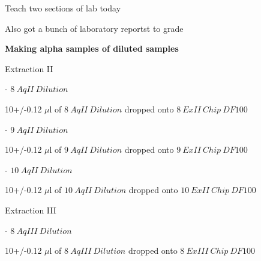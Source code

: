 \documentclass[idxtotoc,hyperref,openany,oneside]{labbook} %
\newcommand{\cmark}{\ding{51}}%
\newcommand{\done}{\rlap{$\square$}{\raisebox{2pt}{\large\hspace{1pt}\cmark}}%
  \hspace{-2.5pt}}
\begin{document}
\begin{todolist}
\item[\done]{Teach two sections of lab today}
\item[\done]{Also got a bunch of laboratory reportst to grade}
\end{todolist}


\textbf{Making alpha samples of diluted samples}
\begin{todolist}
\item[\done]{Extraction II}

  \begin{todolist}
  \item[\done]{- $\boxed{8\ AqII\ Dilution}$}
  \end{todolist}
  \vspace{0.3cm}
  \begin{center}
    10+/-0.12 $\mu$l of $\boxed{8\ AqII\ Dilution}$ dropped onto
    $\boxed{8\ ExII\ Chip\ DF100}$
  \end{center}
  
  \begin{todolist}
  \item[\done]{- $\boxed{9\ AqII\ Dilution}$}
  \end{todolist}
  \vspace{0.3cm}
  \begin{center}
    10+/-0.12 $\mu$l of $\boxed{9\ AqII\ Dilution}$ dropped onto
    $\boxed{9\ ExII\ Chip\ DF100}$
  \end{center}

  \begin{todolist}
  \item[\done]{- $\boxed{10\ AqII\ Dilution}$}
  \end{todolist}
  \vspace{0.3cm}
  \begin{center}
    10+/-0.12 $\mu$l of $\boxed{10\ AqII\ Dilution}$ dropped onto
    $\boxed{10\ ExII\ Chip\ DF100}$
  \end{center}

\item[\done]{Extraction III}

  \begin{todolist}
  \item[\done]{- $\boxed{8\ AqIII\ Dilution}$}
  \end{todolist}
  \vspace{0.3cm}
  \begin{center}
    10+/-0.12 $\mu$l of $\boxed{8\ AqIII\ Dilution}$ dropped onto
    $\boxed{8\ ExIII\ Chip\ DF100}$
  \end{center}
  

\end{todolist}
\end{document}
